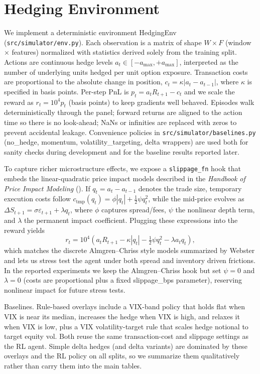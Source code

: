\documentclass[,11pt,letterpaper,twocolumn]{article}
\begin{document}
\section{Hedging Environment}\label{hedging-environment}

We implement a deterministic environment HedgingEnv
(\texttt{src/simulator/env.py}). Each observation is a matrix of shape
$W \times F$ (window × features) normalized with statistics derived
solely from the training split. Actions are continuous hedge levels
$a_t \in [-a_{\max}, +a_{\max}]$, interpreted as the number of
underlying units hedged per unit option exposure. Transaction costs are
proportional to the absolute change in position,
$c_t = \kappa |a_t - a_{t-1}|$, where $\kappa$ is specified in basis
points. Per-step PnL is $p_t = a_t R_{t+1} - c_t$ and we scale the
reward as $r_t = 10^4 p_t$ (basis points) to keep gradients well
behaved. Episodes walk deterministically through
the panel; forward returns are aligned to the action time so there is no
look-ahead; NaNs or infinities are replaced with zeros to prevent
accidental leakage. Convenience policies in
\texttt{src/simulator/baselines.py} (no\_hedge, momentum,
volatility\_targeting, delta wrappers) are used both for sanity checks
during development and for the baseline results reported later.

To capture richer microstructure effects, we expose a
\texttt{slippage\_fn} hook that embeds the linear-quadratic price impact
models described in the \emph{Handbook of Price Impact Modeling}
(). If $q_t = a_t -
a_{t-1}$ denotes the trade size, temporary execution costs follow
$c_{\text{tmp}}(q_t) = \phi |q_t| + \tfrac{1}{2}\psi q_t^2$, while the
mid-price evolves as $\Delta S_{t+1} = \sigma \varepsilon_{t+1} +
\lambda q_t$, where $\phi$ captures spread/fees, $\psi$ the nonlinear
depth term, and $\lambda$ the permanent impact coefficient. Plugging
these expressions into the reward yields
\[
  r_t = 10^4\left(a_t R_{t+1} - \kappa |q_t| - \tfrac{1}{2}\psi q_t^2
  - \lambda a_t q_t\right),
\]
which matches the discrete Almgren--Chriss style models summarized by
Webster and lets us stress test the agent under both spread and
inventory driven frictions.
In the reported experiments we keep the Almgren--Chriss hook but set
$\psi\!=\!0$ and $\lambda\!=\!0$ (costs are proportional plus a fixed
slippage\_bps parameter), reserving nonlinear impact for future
stress tests.

Baselines. Rule-based overlays include a VIX-band policy that holds flat
when VIX is near its median, increases the hedge when VIX is high, and
relaxes it when VIX is low, plus a VIX volatility-target rule that scales
hedge notional to target equity vol. Both reuse the same transaction-cost
and slippage settings as the RL agent. Simple delta hedges (and delta
variants) are dominated by these overlays and the RL policy on all
splits, so we summarize them qualitatively rather than carry them into
the main tables.
\end{document}
